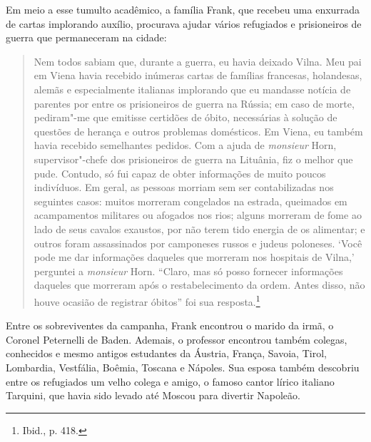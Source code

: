 Em meio a esse tumulto acadêmico, a família Frank, que recebeu uma
enxurrada de cartas implorando auxílio, procurava ajudar vários
refugiados e prisioneiros de guerra que permaneceram na cidade:

\begin{quote}
Nem todos sabiam que, durante a guerra, eu havia deixado Vilna. Meu pai
em Viena havia recebido inúmeras cartas de famílias francesas,
holandesas, alemãs e especialmente italianas implorando que eu mandasse
notícia de parentes por entre os prisioneiros de guerra na Rússia; em
caso de morte, pediram"-me que emitisse certidões de óbito, necessárias à
solução de questões de herança e outros problemas domésticos. Em Viena,
eu também havia recebido semelhantes pedidos. Com a ajuda de \textit{monsieur}
Horn, supervisor"-chefe dos prisioneiros de guerra na Lituânia, fiz
o melhor que pude. Contudo, só fui capaz de obter informações de muito
poucos indivíduos. Em geral, as pessoas morriam sem ser contabilizadas
nos seguintes casos: muitos morreram congelados na estrada, queimados em
acampamentos militares ou afogados nos rios; alguns morreram de fome ao
lado de seus cavalos exaustos, por não terem tido energia de os
alimentar; e outros foram assassinados por camponeses russos e judeus
poloneses. `Você pode me dar informações daqueles que morreram nos
hospitais de Vilna,' perguntei a \textit{monsieur} Horn. ``Claro, mas só posso
fornecer informações daqueles que morreram após o restabelecimento da
ordem. Antes disso, não houve ocasião de registrar óbitos'' foi sua
resposta.\footnote{Ibid., p. 418.}
\end{quote}

Entre os sobreviventes da campanha, Frank encontrou o marido da irmã, o
Coronel Peternelli de Baden. Ademais, o professor encontrou também
colegas, conhecidos e mesmo antigos estudantes da Áustria, França,
Savoia, Tirol, Lombardia, Vestfália, Boêmia, Toscana e Nápoles. Sua
esposa também descobriu entre os refugiados um velho colega e amigo, o
famoso cantor lírico italiano Tarquini, que havia sido levado até Moscou
para divertir Napoleão.

